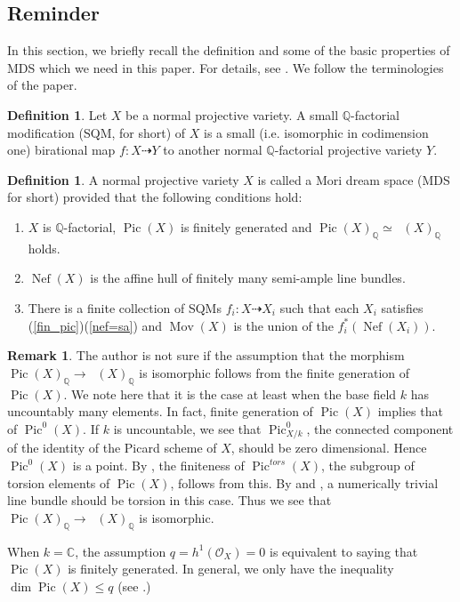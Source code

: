 \documentclass[12pt,twoside]{amsart}
\theoremstyle{definition}
\newtheorem{defi}[theo]{Definition}
\newtheorem{rem}[theo]{Remark}
\newcommand\Nef{\mathop{\mathrm{Nef}}\nolimits}
\newcommand\Pic{\mathop{\mathrm{Pic}}\nolimits}
\newcommand\Num{\mathop{\mathrm{N}^{1}}\nolimits}
\newcommand\Mov{\mathop{\mathrm{Mov}}\nolimits}
\newcommand\bq{\mathbb{Q}}
\begin{document}
\subsection{Reminder}\label{Reminder}
In this section, we briefly recall the definition and some of the basic
properties of MDS which we need in this paper.
For details, see \cite{hk}. We follow the terminologies of the paper.

\begin{defi}\label{sqm}
Let $X$ be a normal projective variety. A small $\bq$-factorial modification (SQM, for short)
of $X$ is a small (i.e. isomorphic in codimension one) birational map
$f:X\dasharrow Y$ to another normal $\bq$-factorial projective variety $Y$.
\end{defi}



\begin{defi}\label{MDS} 
A normal projective variety $X$ is called a Mori dream space
(MDS for short) provided that the following conditions hold:
\begin{enumerate}
\item $X$ is $\bq$-factorial, $\Pic{(X)}$ is finitely generated and
$\Pic{(X)}_{\bq} \simeq \Num{(X)}_{\bq}$ holds. \label{fin_pic}
\item $\Nef{(X)}$ is the affine hull of finitely many semi-ample
line bundles. \label{nef=sa}
\item There is a finite collection of SQMs $f_i: X \dasharrow X_i$
such that each $X_i$ satisfies (\ref{fin_pic})(\ref{nef=sa}) and $\Mov{(X)}$ is the union
of the $f_i^*(\Nef{(X_i)})$.\label{movable cone condition}
\end{enumerate}
\end{defi}

\begin{rem}
The author is not sure if the assumption that the morphism
$\Pic{(X)}_{\bq} \to \Num{(X)}_{\bq}$ is isomorphic follows from the finite generation of $\Pic{(X)}$.
We note here that it is the case at least when the base field $k$ has uncountably many elements.
In fact, finite generation of $\Pic{(X)}$ implies that of $\Pic^{0}{(X)}$. If $k$ is uncountable, we see that
$\Pic^{0}_{X/k}$, the connected component of the identity of the Picard scheme of $X$, should be zero dimensional.
Hence $\Pic^{0}(X)$ is a point. By \cite[Corollary 9.6.17]{fga}, the finiteness of $\Pic^{tors}{(X)}$, the subgroup of
torsion elements of $\Pic{(X)}$, follows from this. By \cite[Theorem 9.6.3]{fga} and \cite[Exercise 9.6.11]{fga},
a numerically trivial line bundle should be torsion in this case.
Thus we see that $\Pic{(X)}_{\bq} \to \Num{(X)}_{\bq}$ is isomorphic.

When $k=\mathbb{C}$, the assumption $q=h^{1}(\mathcal{O}_X)=0$ is equivalent to saying that $\Pic{(X)}$ is
finitely generated.
In general, we only have the inequality $\dim\Pic{(X)}\le q$
(see \cite[Corollary 9.5.13 and Remark 9.5.15]{fga}.)
\end{rem}
\end{document}
